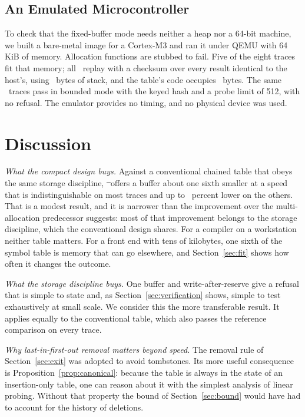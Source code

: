 \subsection{An Emulated Microcontroller}
To check that the fixed-buffer mode needs neither a heap nor a 64-bit machine, we built a bare-metal image for a Cortex-M3 and ran it under QEMU with 64\,KiB of memory. Allocation functions are stubbed to fail. Five of the eight traces fit that memory; all \EmbPass\ replay with a checksum over every result identical to the host's, using \EmbStack\ bytes of stack, and the table's code occupies \EmbCode\ bytes. The same \EmbBoundedPass\ traces pass in bounded mode with the keyed hash and a probe limit of 512, with no refusal. The emulator provides no timing, and no physical device was used.

\section{Discussion}
\label{sec:discussion}

\emph{What the compact design buys.} Against a conventional chained table that obeys the same storage discipline, \st\ offers a buffer about one sixth smaller at a speed that is indistinguishable on most traces and up to \ArenaAbsMax\ percent lower on the others. That is a modest result, and it is narrower than the improvement over the multi-allocation predecessor suggests: most of that improvement belongs to the storage discipline, which the conventional design shares. For a compiler on a workstation neither table matters. For a front end with tens of kilobytes, one sixth of the symbol table is memory that can go elsewhere, and Section~\ref{sec:fit} shows how often it changes the outcome.

\emph{What the storage discipline buys.} One buffer and write-after-reserve give a refusal that is simple to state and, as Section~\ref{sec:verification} shows, simple to test exhaustively at small scale. We consider this the more transferable result. It applies equally to the conventional table, which also passes the reference comparison on every trace.

\emph{Why last-in-first-out removal matters beyond speed.} The removal rule of Section~\ref{sec:exit} was adopted to avoid tombstones. Its more useful consequence is Proposition~\ref{prop:canonical}: because the table is always in the state of an insertion-only table, one can reason about it with the simplest analysis of linear probing. Without that property the bound of Section~\ref{sec:bound} would have had to account for the history of deletions.

